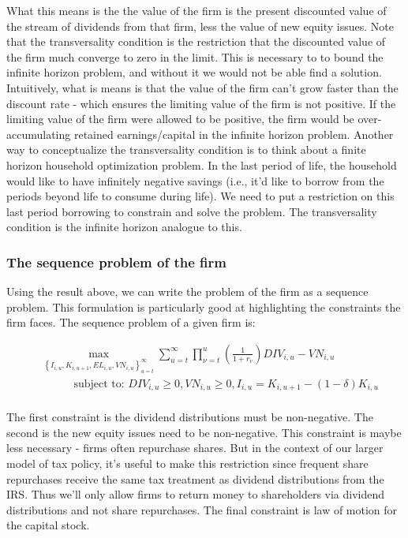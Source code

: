 \documentclass[letterpaper,12pt]{article}
\theoremstyle{definition}
\begin{document}
\begin{spacing}{1.5}
What this means is the the value of the firm is the present discounted value of the stream of dividends from that firm, less the value of new equity issues.  Note that the transversality condition is the restriction that the discounted value of the firm much converge to zero in the limit.  This is necessary to to bound the infinite horizon problem, and without it we would not be able find a solution.  Intuitively, what is means is that the value of the firm can't grow faster than the discount rate - which ensures the limiting value of the firm is not positive.  If the limiting value of the firm were allowed to be positive, the firm would be over-accumulating retained earnings/capital in the infinite horizon problem.  Another way to conceptualize the transversality condition is to think about a finite horizon household optimization problem.  In the last period of life, the household would like to have infinitely negative savings (i.e., it'd like to borrow from the periods beyond life to consume during life).  We need to put a restriction on this last period borrowing to constrain and solve the problem.  The transversality condition is the infinite horizon analogue to this.

\subsubsection*{The sequence problem of the firm}

Using the result above, we can write the problem of the firm as a sequence problem.  This formulation is particularly good at highlighting the constraints the firm faces.  The sequence problem of a given firm is:

\begin{equation}
\label{eqn:firm_seq_prob}
\begin{split}
&\max_{\left\{I_{i,u}, K_{i,u+1},EL_{i,u},VN_{i,u}\right\}_{u=t}^{\infty}} \sum_{u=t}^{\infty} \prod_{\nu=t}^{u} \left(\frac{1}{1+r_{v}}\right) DIV_{i,u}-VN_{i,u} \\
&\quad\quad\quad \text{subject to: } DIV_{i,u}\geq0, VN_{i,u}\geq0, I_{i,u} = K_{i,u+1}-(1-\delta)K_{i,u} \\
\end{split}
\end{equation}

The first constraint is the dividend distributions must be non-negative.  The second is the new equity issues need to be non-negative.  This constraint is maybe less necessary - firms often repurchase shares.  But in the context of our larger model of tax policy, it's useful to make this restriction since frequent share repurchases receive the same tax treatment as dividend distributions from the IRS.  Thus we'll only allow firms to return money to shareholders via dividend distributions and not share repurchases.   The final constraint is law of motion for the capital stock.


\end{spacing}
\end{document}
